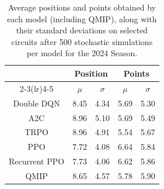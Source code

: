 \begin{table}[H]
\centering
\begin{tabular}{ccccc}
\toprule
\multicolumn{1}{l}{}               & \multicolumn{2}{c}{Position}   & \multicolumn{2}{c}{Points} \\ \cmidrule(lr){2-3}\cmidrule(lr){4-5}
\multicolumn{1}{c}{Model}          &    $\mu$ & $\sigma$ &   $\mu$  & $\sigma$ \\ \midrule
\multicolumn{1}{c}{Double DQN    } &     8.45  &     4.34  &     5.69  &     5.30  \\
\multicolumn{1}{c}{A2C           } &     8.96  &     5.10  &     5.69  &     5.49  \\
\multicolumn{1}{c}{TRPO          } &     8.96  &     4.91  &     5.54  &     5.67  \\
\multicolumn{1}{c}{PPO           } &     7.72  &     4.08  &     6.64  &     5.84  \\
\multicolumn{1}{c}{Recurrent PPO } &     7.73  &     4.06  &     6.62  &     5.86  \\
\multicolumn{1}{c}{QMIP          } &     8.65  &     4.57  &     5.78  &     5.90  \\
\bottomrule
\end{tabular}
\caption{Average positions and points obtained by each model (including QMIP), along with their standard deviations on selected circuits after 500 stochastic simulations per model for the 2024 Season.}
\label{tab:tab_qmip_vs_drl_stochastic_2024}
\end{table}